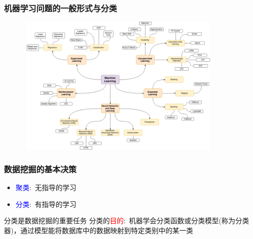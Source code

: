 {{\frame
{
	\frametitle{机器学习问题的一般形式与分类}
\begin{figure}[h!]
\centering
\vspace*{-7pt}
\includegraphics[height=2.7in,width=4.0in,viewport=0 0 875 620,clip]{Figures/ML_class.png}
\label{ML_classification}
\end{figure}
}

\frame
{
	\frametitle{数据挖掘的基本决策}
\begin{itemize}
	\item \textcolor{blue}{聚类}:~无指导的学习
	\item \textcolor{blue}{分类}:~有指导的学习
\end{itemize}
分类是数据挖掘的重要任务
\vskip 2pt
分类的\textcolor{red}{目的}:~机器学会分类函数或分类模型(称为分类器)，通过模型能将数据库中的数据映射到特定类别中的某一类

\begin{figure}[h!]
\centering
\vspace*{-7pt}
\label{ML_classification-animate}
\end{figure}
}

}}
